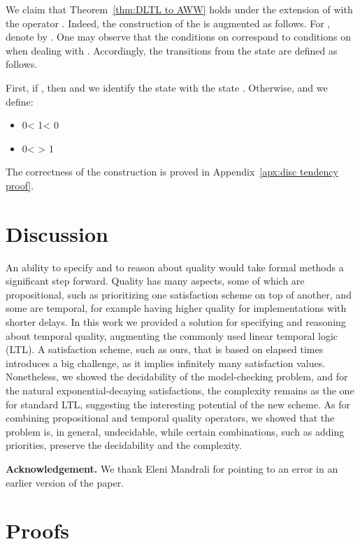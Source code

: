 \documentclass{llncs}
\newcommand{\gap}{\vspace*{0.25 cm}}
\begin{document}
We claim that Theorem~\ref{thm:DLTL to AWW} holds under the extension of  with the operator .
Indeed, the construction of the  is augmented as follows. For , denote  by . One may observe that the conditions on  correspond to conditions on  when dealing with . Accordingly, the transitions from the state  are defined as follows.

First, if , then  and we identify the state  with the state
. Otherwise,  and we define:
\begin{itemize}
\item

 0\le \tau< 1\tau {}\tau < 0

\item

0< \tau{}\tau > 1\tau {}
\end{itemize}
The correctness of the construction is proved in Appendix~\ref{apx:disc tendency proof}.




\section{Discussion}

An ability to specify and to reason about quality would take formal methods a significant step forward. 
Quality has many aspects, some of which are propositional, such as prioritizing one satisfaction scheme on top of another, and some are temporal, for example having higher quality for implementations with shorter delays. In this work we provided a solution for specifying and reasoning about temporal quality, augmenting the commonly used linear temporal logic (LTL). A satisfaction scheme, such as ours, that is based on elapsed times introduces a big challenge, as it implies infinitely many satisfaction values. Nonetheless, we showed the decidability of the model-checking problem, and for the natural exponential-decaying satisfactions, the complexity remains as the one for standard LTL, suggesting the interesting potential of the new scheme. As for combining propositional and temporal quality operators, we showed that the problem is, in general, undecidable, while certain combinations, such as adding priorities, preserve the decidability and the complexity.

\gap\noindent
{\bf Acknowledgement.} We thank Eleni Mandrali for pointing to an error in an earlier version of the paper.
\tiny

\normalsize

\newpage
\appendix
\section{Proofs}
\end{document}
